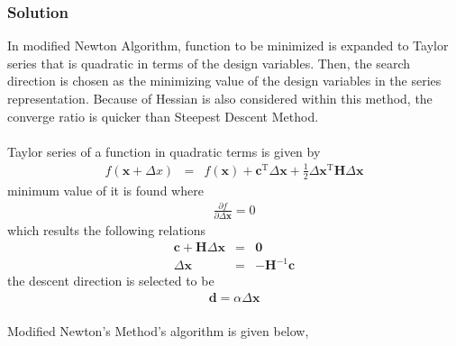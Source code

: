 \documentclass[]{report}
\begin{document}
\subsubsection*{Solution}
In modified Newton Algorithm, function to be minimized is expanded to Taylor series that is quadratic in terms of the design variables. Then, the search direction is chosen as the minimizing value of the design variables in the series representation. Because of Hessian is also considered within this method, the converge ratio is quicker than Steepest Descent Method. \\
~\\
Taylor series of a function in quadratic terms is given by
\begin{eqnarray*}
f\left(\mathbf x+\Delta x\right)&=& f\left(\mathbf x\right)+\mathbf c^\mathrm{T} \Delta \mathbf x+\frac{1}{2}\Delta \mathbf x^\mathrm{T}\mathbf H \Delta \mathbf x
\end{eqnarray*}
minimum value of it is found where
\begin{eqnarray*}
\frac{\partial f}{\partial \Delta \mathbf x }=0
\end{eqnarray*}
which results the following relations
\begin{eqnarray*}
\mathbf{c}+\mathbf{H}\Delta \mathbf{x}&=& \mathbf 0\\
\Delta \mathbf{x} &=& -\mathbf{H}^{-1}\mathbf{c}
\end{eqnarray*}
the descent direction is selected to be
\begin{eqnarray*}
\mathbf{d}=\alpha \Delta \mathbf x
\end{eqnarray*}
\newpage ~\\ Modified Newton's Method's algorithm is given below,
\\
~\\
\end{document}
